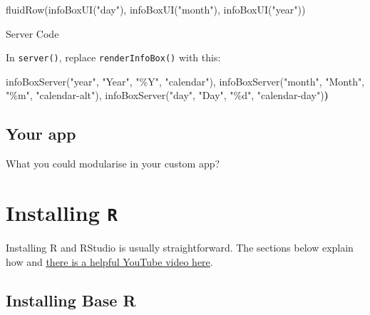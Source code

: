 \documentclass[
  oneside]{book}
\newenvironment{Shaded}{\begin{snugshade}}{\end{snugshade}}
\newcommand{\ErrorTok}[1]{\textcolor[rgb]{0.64,0.00,0.00}{\textbf{#1}}}
\newcommand{\FunctionTok}[1]{\textcolor[rgb]{0.00,0.00,0.00}{#1}}
\newcommand{\NormalTok}[1]{#1}
\newcommand{\StringTok}[1]{\textcolor[rgb]{0.31,0.60,0.02}{#1}}
\begin{document}
\begin{Shaded}
\begin{Highlighting}[]
\FunctionTok{fluidRow}\NormalTok{(}\FunctionTok{infoBoxUI}\NormalTok{(}\StringTok{"day"}\NormalTok{), }\FunctionTok{infoBoxUI}\NormalTok{(}\StringTok{"month"}\NormalTok{), }\FunctionTok{infoBoxUI}\NormalTok{(}\StringTok{"year"}\NormalTok{))}
\end{Highlighting}
\end{Shaded}

Server Code

In \texttt{server}\texttt{()}, replace \texttt{renderInfoBox}\texttt{()} with this:

\begin{Shaded}
\begin{Highlighting}[]
\FunctionTok{infoBoxServer}\NormalTok{(}\StringTok{"year"}\NormalTok{, }\StringTok{"Year"}\NormalTok{, }\StringTok{"\%Y"}\NormalTok{, }\StringTok{"calendar"}\NormalTok{),}
\FunctionTok{infoBoxServer}\NormalTok{(}\StringTok{"month"}\NormalTok{, }\StringTok{"Month"}\NormalTok{, }\StringTok{"\%m"}\NormalTok{, }\StringTok{"calendar{-}alt"}\NormalTok{),}
\FunctionTok{infoBoxServer}\NormalTok{(}\StringTok{"day"}\NormalTok{, }\StringTok{"Day"}\NormalTok{, }\StringTok{"\%d"}\NormalTok{, }\StringTok{"calendar{-}day"}\NormalTok{)}\ErrorTok{)}
\end{Highlighting}
\end{Shaded}

\hypertarget{your-app-modules}{%
\section{Your app}\label{your-app-modules}}

What you could modularise in your custom app?

\hypertarget{appendix-appendices}{%
\appendix}


\hypertarget{installing-r}{%
\chapter{\texorpdfstring{Installing \texttt{R}}{Installing R}}\label{installing-r}}

Installing R and RStudio is usually straightforward. The sections below explain how and \href{https://www.youtube.com/watch?v=lVKMsaWju8w}{there is a helpful YouTube video here}.

\hypertarget{installing-base-r}{%
\section{Installing Base R}\label{installing-base-r}}
\end{document}
